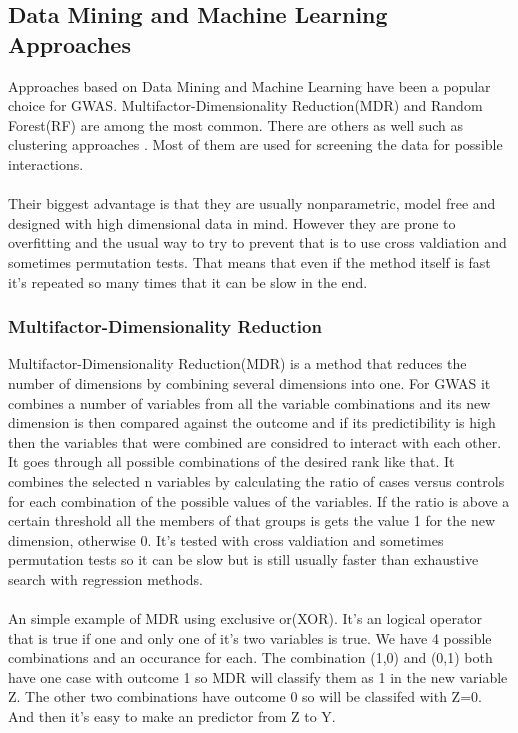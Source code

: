\documentclass[10pt,a4paper]{article}
\begin{document}
\subsection{Data Mining and Machine Learning Approaches}
\label{data_machine_learning}
Approaches based on Data Mining and Machine Learning have been a popular choice for GWAS. Multifactor-Dimensionality Reduction(MDR)\cite{mdr_2001} and Random Forest(RF)\cite{random_forest} are among the most common\cite{gene_enviroment_2013,cordell_detect_review}. There are others as well such as clustering approaches \cite{fast_high_order_cluster}. Most of them are used for screening the data for possible interactions\cite{gene_enviroment_2013,cordell_detect_review}.\\
\\
Their biggest advantage is that they are usually nonparametric, model free and designed with high dimensional data in mind. However they are prone to overfitting and the usual way to try to prevent that is to use cross valdiation and sometimes permutation tests. That means that even if the method itself is fast it's repeated so many times that it can be slow in the end.\cite{cordell_detect_review}

\subsubsection{Multifactor-Dimensionality Reduction}
Multifactor-Dimensionality Reduction(MDR) is a method that reduces the number of dimensions by combining several dimensions into one. For GWAS it combines a number of variables from all the variable combinations and its new dimension is then compared against the outcome and if its predictibility is high then the variables that were combined are considred to interact with each other. It goes through all possible combinations of the desired rank like that. It combines the selected n variables by calculating the ratio of cases versus controls for each combination of the possible values of the variables. If the ratio is above a certain threshold all the members of that groups is gets the value 1 for the new dimension, otherwise 0. It's tested with cross valdiation and sometimes permutation tests so it can be slow but is still usually faster than exhaustive search with regression methods.\cite{cordell_detect_review,mdr_2001}\\
\\
An simple example of MDR using exclusive or(XOR). It's an logical operator that is true if one and only one of it's two variables is true. We have 4 possible combinations and an occurance for each. The combination (1,0) and (0,1) both have one case with outcome 1 so MDR will classify them as 1 in the new variable Z. The other two combinations have outcome 0 so will be classifed with Z=0. And then it's easy to make an predictor from Z to Y.
\end{document}
